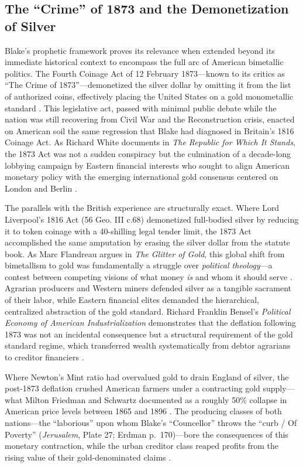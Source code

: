 \documentclass[
]{article}
\begin{document}
\subsection{The ``Crime'' of 1873 and the Demonetization of
Silver}\label{the-crime-of-1873-and-the-demonetization-of-silver}

Blake's prophetic framework proves its relevance when extended beyond
its immediate historical context to encompass the full arc of American
bimetallic politics. The Fourth Coinage Act of 12 February 1873---known
to its critics as ``The Crime of 1873''---demonetized the silver dollar
by omitting it from the list of authorized coins, effectively placing
the United States on a gold monometallic standard
\citep{laughlin1898bimetallism}. This legislative act, passed with
minimal public debate while the nation was still recovering from Civil
War and the Reconstruction crisis, enacted on American soil the same
regression that Blake had diagnosed in Britain's 1816 Coinage Act. As
Richard White documents in \emph{The Republic for Which It Stands}, the
1873 Act was not a sudden conspiracy but the culmination of a
decade-long lobbying campaign by Eastern financial interests who sought
to align American monetary policy with the emerging international gold
consensus centered on London and Berlin \citep{white2017republic}.

The parallels with the British experience are structurally exact. Where
Lord Liverpool's 1816 Act (56 Geo. III c.68) demonetized full-bodied
silver by reducing it to token coinage with a 40-shilling legal tender
limit, the 1873 Act accomplished the same amputation by erasing the
silver dollar from the statute book. As Marc Flandreau argues in
\emph{The Glitter of Gold}, this global shift from bimetallism to gold
was fundamentally a struggle over \emph{political theology}---a contest
between competing visions of what money \emph{is} and whom it should
serve \citep{flandreau2004glitter}. Agrarian producers and Western
miners defended silver as a tangible sacrament of their labor, while
Eastern financial elites demanded the hierarchical, centralized
abstraction of the gold standard. Richard Franklin Bensel's
\emph{Political Economy of American Industrialization} demonstrates that
the deflation following 1873 was not an incidental consequence but a
structural requirement of the gold standard regime, which transferred
wealth systematically from debtor agrarians to creditor financiers
\citep{bensel2000political}.

Where Newton's Mint ratio had overvalued gold to drain England of
silver, the post-1873 deflation crushed American farmers under a
contracting gold supply---what Milton Friedman and Schwartz documented
as a roughly 50\% collapse in American price levels between 1865 and
1896 \citep{friedman1963monetary}. The producing classes of both
nations---the ``laborious'' upon whom Blake's ``Councellor'' throws the
``curb / Of Poverty'' (\emph{Jerusalem}, Plate 27; Erdman p.~170)---bore
the consequences of this monetary contraction, while the urban creditor
class reaped profits from the rising value of their gold-denominated
claims \citep{delmar1895history, erdman1988complete}.
\end{document}
